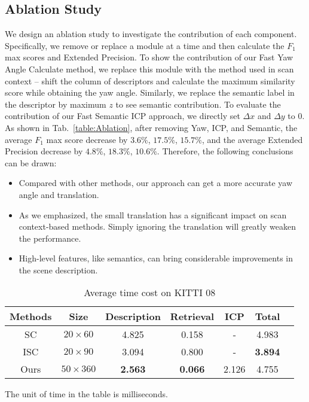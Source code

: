 \documentclass[letterpaper, 10 pt, conference]{ieeeconf}
\begin{document}
\subsection{Ablation Study}
We design an ablation study to investigate the contribution of each component. Specifically, we remove or replace a module at a time and then calculate the \(F_1\) max scores and Extended Precision. To show the contribution of our Fast Yaw Angle Calculate method, we replace this module with the method used in scan context -- shift the column of descriptors and calculate the maximum similarity score while obtaining the yaw angle. Similarly, we replace the semantic label in the descriptor by maximum \(z\) to see semantic contribution. To evaluate the contribution of our Fast Semantic ICP approach, we directly set \(\Delta x\) and \(\Delta y\) to 0. As shown in Tab.~\ref{table:Ablation}, after removing Yaw, ICP, and Semantic, the average \(F_1\) max score decrease by \(3.6\%\), \(17.5\%\), \(15.7\%\), and the average Extended Precision decrease by \(4.8\%\), \(18.3\%\), \(10.6\%\). Therefore, the following conclusions can be drawn:
\begin{itemize}
     \item Compared with other methods, our approach can get a more accurate yaw angle and translation.
     \item As we emphasized, the small translation has a significant impact on scan context-based methods. Simply ignoring the translation will greatly weaken the performance.
     \item High-level features, like semantics, can bring considerable improvements in the scene description.
\end{itemize}

\begin{table}[t]\footnotesize
    \caption{\centering Average time cost on KITTI 08}\vspace{-3mm}
    \label{table:time}
    \begin{center}
    \begin{threeparttable}
    {
    \begin{tabular}{c c c c c c c}
    \hline
    Methods &Size& Description & Retrieval & ICP & Total\\ 
    \hline
    SC&$20\times 60$&4.825&0.158&-&4.983\\
    ISC&$20\times 90$&3.094&0.800&-&\textbf{3.894}\\
    Ours&$50\times 360$&\textbf{2.563}&\textbf{0.066}&2.126&4.755\\
    \hline
    \end{tabular}
    }
    \begin{tablenotes} 
\footnotesize
            \item The unit of time in the table is milliseconds.
         \end{tablenotes}
    \end{threeparttable}
    \end{center}
    \end{table}
\end{document}
